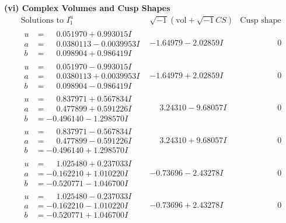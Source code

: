 \documentclass[1p]{elsarticle_modified}
\theoremstyle{definition}
\newcommand{\I}{\sqrt{-1}}
\begin{document}
\newpage\flushleft \textbf{(vi) Complex Volumes and Cusp Shapes}
$$\begin{array}{c|c|c}  
\text{Solutions to }I^u_{1}& \I (\text{vol} + \sqrt{-1}CS) & \text{Cusp shape}\\
 \hline 
\begin{aligned}
u &= \phantom{-}0.051970 + 0.993015 I \\
a &= \phantom{-}0.0380113 - 0.0039953 I \\
b &= \phantom{-}0.098904 + 0.986419 I\end{aligned}
 & -1.64979 - 2.02859 I & \phantom{-0.000000 } 0 \\ \hline\begin{aligned}
u &= \phantom{-}0.051970 - 0.993015 I \\
a &= \phantom{-}0.0380113 + 0.0039953 I \\
b &= \phantom{-}0.098904 - 0.986419 I\end{aligned}
 & -1.64979 + 2.02859 I & \phantom{-0.000000 } 0 \\ \hline\begin{aligned}
u &= \phantom{-}0.837971 + 0.567834 I \\
a &= \phantom{-}0.477899 + 0.591226 I \\
b &= -0.496140 - 1.298570 I\end{aligned}
 & \phantom{-}3.24310 - 9.68057 I & \phantom{-0.000000 } 0 \\ \hline\begin{aligned}
u &= \phantom{-}0.837971 - 0.567834 I \\
a &= \phantom{-}0.477899 - 0.591226 I \\
b &= -0.496140 + 1.298570 I\end{aligned}
 & \phantom{-}3.24310 + 9.68057 I & \phantom{-0.000000 } 0 \\ \hline\begin{aligned}
u &= \phantom{-}1.025480 + 0.237033 I \\
a &= -0.162210 + 1.010220 I \\
b &= -0.520771 - 1.046700 I\end{aligned}
 & -0.73696 - 2.43278 I & \phantom{-0.000000 } 0 \\ \hline\begin{aligned}
u &= \phantom{-}1.025480 - 0.237033 I \\
a &= -0.162210 - 1.010220 I \\
b &= -0.520771 + 1.046700 I\end{aligned}
 & -0.73696 + 2.43278 I & \phantom{-0.000000 } 0 \\ \hline\begin{aligned}

\end{aligned}
\end{array}$$
\end{document}
